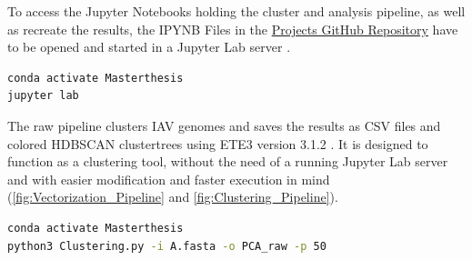 
To access the Jupyter Notebooks holding the cluster and analysis pipeline, as well as recreate the results, the IPYNB Files in the \href{https://github.com/ahenoch/Masterthesis.git}{Projects GitHub Repository} have to be opened and started in a Jupyter Lab server \autocite{kluyver_jupyter_2016}.

\begin{lstlisting}[language=sh]
conda activate Masterthesis
jupyter lab
\end{lstlisting}  

The raw pipeline clusters \gls{IAV} genomes and saves the results as CSV files and colored \gls{HDBSCAN} clustertrees using ETE3 version 3.1.2 \autocite{huerta-cepas_ete_2016}. It is designed to function as a clustering tool, without the need of a running Jupyter Lab server and with easier modification and faster execution in mind (\autoref{fig:Vectorization_Pipeline} and \autoref{fig:Clustering_Pipeline}). 

\begin{lstlisting}[language=sh]
conda activate Masterthesis
python3 Clustering.py -i A.fasta -o PCA_raw -p 50
\end{lstlisting}  

